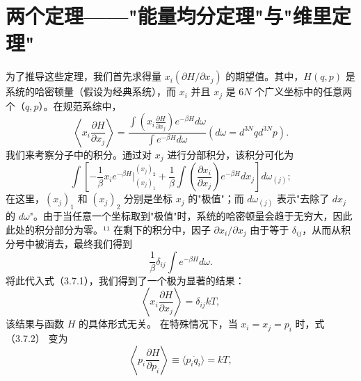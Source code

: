 \section{两个定理——"能量均分定理"与"维里定理"}\label{ux4e24ux4e2aux5b9aux7406ux80fdux91cfux5747ux5206ux5b9aux7406ux4e0eux7ef4ux91ccux5b9aux7406}
为了推导这些定理，我们首先求得量 \(x_i(\partial H/\partial x_j)\) 的期望值。其中，\(H(q,p)\) 是系统的哈密顿量（假设为经典系统），而 \(x_i\)
并且 \(x_{j}\) 是 \(6N\) 个广义坐标中的任意两个（\(q, p\)）。在规范系综中，
\begin{equation}\tag{3.5.35}\label{eq:3.5.35}
\left\langle x _ { i } \frac { \partial H } { \partial x _ { j } } \right\rangle = \frac { \int \left( x _ { i } \frac { \partial H } { \partial x _ { j } } \right) e ^{- \beta H} d \omega } { \int e ^{- \beta H} d \omega }  \left( d \omega = d ^{3 N} q d ^{3 N} p \right) .
\end{equation}
我们来考察分子中的积分。通过对 \(x_j\) 进行分部积分，该积分可化为
\begin{equation}\tag{3.5.36}\label{eq:3.5.36}
\int \left[ - \frac { 1 } { \beta } x _ { i } e ^{- \beta H} \bigg | _ { ( x _ { j } ) _ { 1 } } ^{( x _ { j} ) _ { 2 } } + \frac { 1 } { \beta } \int \left( \frac { \partial x _ { i } } { \partial x _ { j } } \right) e ^{- \beta H} d x _ { j } \right] d \omega _ { ( j ) } ;
\end{equation}
在这里，\((x_j)_1\) 和 \((x_j)_2\) 分别是坐标 \(x_j\) 的"极值"；而 \(d\omega_{(j)}\) 表示"去除了 \(dx_j\) 的 \(d\omega\)"。由于当任意一个坐标取到"极值"时，系统的哈密顿量会趋于无穷大，因此此处的积分部分为零。¹¹ 在剩下的积分中，因子 \(\partial x_i/\partial x_j\) 由于等于 \(\delta_{ij}\)，从而从积分号中被消去，最终我们得到
\begin{equation}\tag{3.5.37}\label{eq:3.5.37}
\frac { 1 } { \beta } \delta _ { i j } \int e ^{- \beta H} d \omega .
\end{equation}
将此代入式（3.7.1），我们得到了一个极为显著的结果：
\begin{equation}\tag{3.5.38}\label{eq:3.5.38}
\left\langle x _ { i } \frac { \partial H } { \partial x _ { j } } \right\rangle = \delta _ { i j } k T ,
\end{equation}
该结果与函数 \(H\) 的具体形式无关。
在特殊情况下，当 \(x_{i}=x_{j}=p_{i}\) 时，式（3.7.2） 变为
\begin{equation}\tag{3.5.39}\label{eq:3.5.39}
\left\langle p _ { i } \frac { \partial H } { \partial p _ { i } } \right\rangle \equiv \langle p _ { i } \dot { q } _ { i } \rangle = k T ,
\end{equation}
